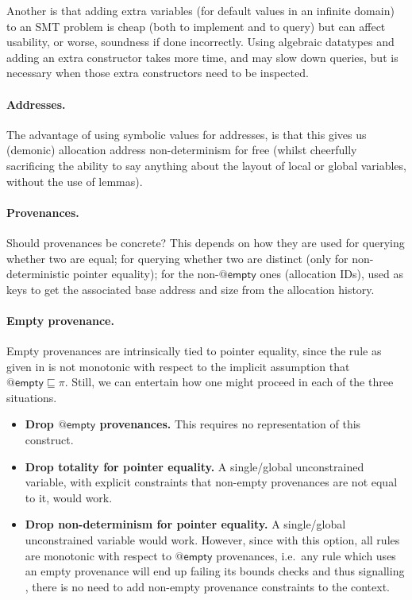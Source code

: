 Another is that adding extra variables (for default values in an infinite
domain) to an SMT problem is cheap (both to implement and to query) but can
affect usability, or worse, soundness if done incorrectly. Using algebraic
datatypes and adding an extra constructor takes more time, and may slow down
queries, but is necessary when those extra constructors need to be inspected.

\paragraph{Addresses.}%
The advantage of using symbolic values for addresses, is that this gives us
(demonic) allocation address non-determinism for free (whilst cheerfully
sacrificing the ability to say anything about the layout of local or global
variables, without the use of lemmas).

\paragraph{Provenances.}%
Should provenances be concrete? This depends on how they are used \textemdash{}
for querying whether two are equal; for querying whether two are distinct (only
for non-deterministic pointer equality); for the non-$@\mathsf{empty}$ ones
(allocation IDs), used as keys to get the associated base address and size from
the allocation history.

\paragraph{Empty provenance.}%
Empty provenances are intrinsically tied to pointer equality, since the rule
as given in  is not monotonic with respect to the implicit assumption
that $@\mathsf{empty} \sqsubseteq \pi$. Still, we can entertain how one might
proceed in each of the three situations.
\begin{itemize}
    \item \textbf{Drop $@\mathsf{empty}$ provenances.} This requires
        no representation of this construct.
    \item \textbf{Drop totality for pointer equality.}
        A single/global unconstrained variable, with explicit constraints that
        non-empty provenances are not equal to it, would work.
    \item \textbf{Drop non-determinism for pointer equality.}
        A single/global unconstrained variable would work. However, since with
        this option, all rules are monotonic with respect to $@\mathsf{empty}$
        provenances, i.e.\ any rule which uses an empty provenance will end up
        failing its bounds checks and thus signalling , there is no need
        to add non-empty provenance constraints to the context.
\end{itemize}

